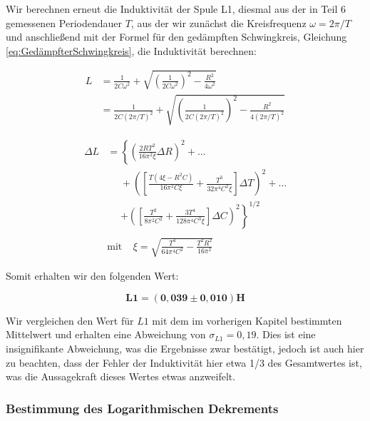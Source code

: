 \documentclass{article}
\begin{document}
Wir berechnen erneut die Induktivität der Spule L1, diesmal aus der in Teil 6 gemessenen Periodendauer $T$, aus der wir zunächst die Kreisfrequenz $\omega = 2 \pi / T$ und anschließend mit der Formel für den gedämpften Schwingkreis, Gleichung \ref{eq:GedämpfterSchwingkreis}, die Induktivität berechnen:

\begin{equation}
    \begin{split}
        L &= \frac{1}{2C\omega^2} + \sqrt{\left( \frac{1}{2C\omega^2} \right)^2 - \frac{R^2}{4 \omega^2}} \\
        &= \frac{1}{2C(2 \pi / T)^2} + \sqrt{\left( \frac{1}{2C(2 \pi / T)^2} \right)^2 - \frac{R^2}{4 (2 \pi / T)^2}}
    \end{split}
\end{equation}

\begin{equation}
    \begin{split}
        \Delta L &= \left\{ \left( \frac{2RT^2}{16 \pi^2 \xi} \Delta R \right)^2 + \ldots \right. \\
        &\phantom{=} + \left( \left[ \frac{T(4\xi - R^2 C)}{16 \pi^2 C \xi} + \frac{T^3}{32 \pi^4 C^2 \xi} \right] \Delta T \right)^2 + \ldots \\
        &\phantom{=} \left. + \left( \left[ \frac{T^2}{8 \pi^2 C^2} + \frac{3 T^4}{128 \pi^4 C^3 \xi} \right] \Delta C \right)^2 \right\}^{1/2} \\ \\
        &\text{mit} \ \ \ \ \ \xi = \sqrt{\frac{T^4}{64 \pi^4 C^2} - \frac{T^2 R^2}{16 \pi^2}}
    \end{split}
\end{equation}

Somit erhalten wir den folgenden Wert:

\begin{equation}
    \bm{L1 = (0,039 \pm 0,010)}\textbf{H}
\end{equation}


Wir vergleichen den Wert für $L1$ mit dem im vorherigen Kapitel bestimmten Mittelwert und erhalten eine Abweichung von $\sigma_{L1} = 0,19$. Dies ist eine insignifikante Abweichung, was die Ergebnisse zwar bestätigt, jedoch ist auch hier zu beachten, dass der Fehler der Induktivität hier etwa 1/3 des Gesamtwertes ist, was die Aussagekraft dieses Wertes etwas anzweifelt.  

\newpage
\subsubsection{Bestimmung des Logarithmischen Dekrements}
\end{document}
